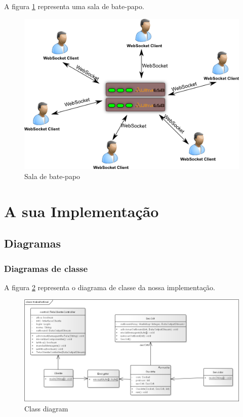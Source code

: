 \documentclass[a4paper,12pt]{article}
\begin{document}
              
A figura \ref{fig1} representa uma sala de bate-papo.
\begin{figure}[H]
	\centering
	\includegraphics[scale=0.4]{img/454.png}    
	\caption{Sala de bate-papo}
	\label{fig1}     
\end{figure} 

\section{A sua Implementação}
\subsection{Diagramas}
\subsubsection{Diagramas de classe}
A figura \ref{fig2} representa o diagrama de classe da nossa implementação.
\begin{figure}[H]
	\includegraphics[scale=0.4]{img/class.png}    
	\caption{Class diagram}
	\centering
	\label{fig2}
	\end{figure} 
\end{document}
